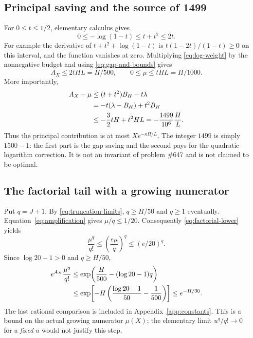 \documentclass[11pt,a4paper]{article}
\theoremstyle{definition}
\theoremstyle{remark}
\numberwithin{equation}{section}
\newcommand{\rate}{\kappa}
\begin{document}
\subsection{Principal saving and the source of 1499}
For $0\le t\le1/2$, elementary calculus gives
\begin{equation}\label{eq:log-weight}
 0\le-\log(1-t)\le t+t^2\le2t.
\end{equation}
For example the derivative of $t+t^2+\log(1-t)$ is
$t(1-2t)/(1-t)\ge0$ on this interval, and the function vanishes at zero.
Multiplying \eqref{eq:log-weight} by the nonnegative budget and using
\eqref{eq:gap-and-bounds} gives
\begin{equation}\label{eq:amplification}
 A_X\le2tHL=H/500,
 \qquad 0\le\mu\le tHL=H/1000.
\end{equation}
More importantly,
\begin{align}
 A_X-\mu
 &\le(t+t^2)B_H-t\lambda\notag\\
 &=-t(\lambda-B_H)+t^2 B_H\notag\\
 &\le-\frac32tH+t^2HL
 =-\frac{1499}{10^6}\frac HL.\label{eq:principal}
\end{align}
Thus the principal contribution is at most $Xe^{-\rate H/L}$.
The integer $1499$ is simply $1500-1$: the first part is the gap saving and the
second pays for the quadratic logarithm correction. It is not an invariant of
problem \#647 and is not claimed to be optimal.

\subsection{The factorial tail with a growing numerator}
Put $q=J+1$. By \eqref{eq:truncation-limits}, $q\ge H/50$ and $q\ge1$
eventually. Equation~\eqref{eq:amplification} gives $\mu/q\le1/20$.
Consequently \eqref{eq:factorial-lower} yields
\begin{equation}\label{eq:factorial-tail}
 \frac{\mu^q}{q!}\le\left(\frac{e\mu}{q}\right)^q
 \le(e/20)^q.
\end{equation}
Since $\log20-1>0$ and $q\ge H/50$,
\begin{align}
 e^{A_X}\frac{\mu^q}{q!}
 &\le\exp\!\left(\frac H{500}-(\log20-1)q\right)\notag\\
 &\le\exp\!\left[-H\left(\frac{\log20-1}{50}-\frac1{500}\right)\right]
 \le e^{-H/30}.\label{eq:amplified-tail}
\end{align}
The last rational comparison is included in Appendix~\ref{app:constants}.
This is a bound on the actual growing numerator $\mu(X)$; the elementary limit
$u^q/q!\to0$ for a \emph{fixed} $u$ would not justify this step.
\end{document}

